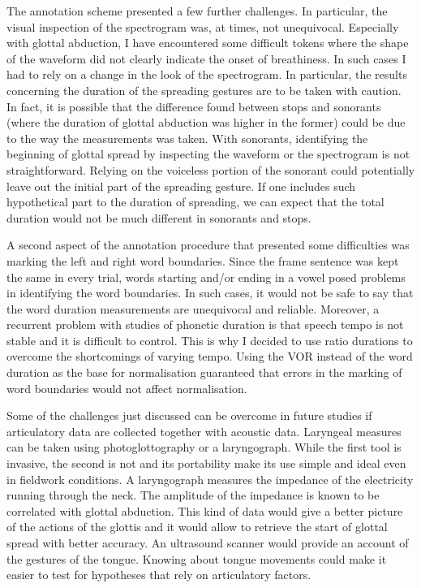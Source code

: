 \documentclass[11pt,a4paper,oneside,openany]{memoir}\usepackage[]{graphicx}\usepackage[]{color}
\begin{document}
The annotation scheme presented a few further challenges.
In particular, the visual inspection of the spectrogram was, at times, not unequivocal.
Especially with glottal abduction, I have encountered some difficult tokens where the shape of the waveform did not clearly indicate the onset of breathiness.
In such cases I had to rely on a change in the look of the spectrogram.
In particular, the results concerning the duration of the spreading gestures are to be taken with caution.
In fact, it is possible that the difference found between stops and sonorants (where the duration of glottal abduction was higher in the former) could be due to the way the measurements was taken.
With sonorants, identifying the beginning of glottal spread by inspecting the waveform or the spectrogram is not straightforward.
Relying on the voiceless portion of the sonorant could potentially leave out the initial part of the spreading gesture.
If one includes such hypothetical part to the duration of spreading, we can expect that the total duration would not be much different in sonorants and stops.

A second aspect of the annotation procedure that presented some difficulties was marking the left and right word boundaries.
Since the frame sentence was kept the same in every trial, words starting and/or ending in a vowel posed problems in identifying the word boundaries.
In such cases, it would not be safe to say that the word duration measurements are unequivocal and reliable.
Moreover, a recurrent problem with studies of phonetic duration is that speech tempo is not stable and it is difficult to control.
This is why I decided to use ratio durations to overcome the shortcomings of varying tempo.
Using the VOR instead of the word duration as the base for normalisation guaranteed that errors in the marking of word boundaries would not affect normalisation.



Some of the challenges just discussed can be overcome in future studies if articulatory data are collected together with acoustic data.
Laryngeal measures can be taken using photoglottography or a laryngograph.
While the first tool is invasive, the second is not and its portability make its use simple and ideal even in fieldwork conditions.
A laryngograph measures the impedance of the electricity running through the neck.
The amplitude of the impedance is known to be correlated with glottal abduction.
This kind of data would give a better picture of the actions of the glottis and it would allow to retrieve the start of glottal spread with better accuracy.
An ultrasound scanner would provide an account of the gestures of the tongue.
Knowing about tongue movements could make it easier to test for hypotheses that rely on articulatory factors.
\end{document}
